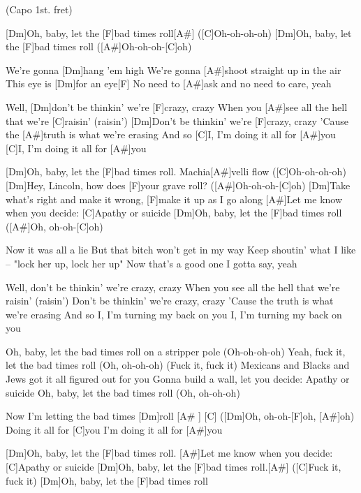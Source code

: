 
{\footnotesize(Capo 1st. fret)}

\begin{guitar}
	[Dm]Oh, baby, let the [F]bad times roll[A#] ([C]Oh-oh-oh-oh)
	[Dm]Oh, baby, let the [F]bad times roll ([A#]Oh-oh-oh-[C]oh)
	
	We're gonna [Dm]hang 'em high
	We’re gonna [A#]shoot straight up in the air
	This eye is [Dm]for an eye[F]{}
	No need to [A#]ask and no need to care, yeah
	
	Well, [Dm]don't be thinkin' we're [F]crazy, crazy
	When you [A#]see all the hell that we're [C]raisin' (raisin')
	[Dm]Don't be thinkin' we're [F]crazy, crazy
	'Cause the [A#]truth is what we're erasing
	And so [C]I, I’m doing it all for [A#]you
	[C]I, I'm doing it all for [A#]you
	
	[Dm]Oh, baby, let the [F]bad times roll. Machia[A#]velli flow ([C]Oh-oh-oh-oh)
	[Dm]Hey, Lincoln, how does [F]your grave roll? ([A#]Oh-oh-oh-[C]oh)
	[Dm]Take what’s right and make it wrong, [F]make it up as I go along
	[A#]Let me know when you decide: [C]Apathy or suicide
	[Dm]Oh, baby, let the [F]bad times roll ([A#]Oh, oh-oh-[C]oh)
	
	Now it was all a lie
	But that bitch won’t get in my way
	Keep shoutin’ what I like – "lock her up, lock her up"
	Now that’s a good one I gotta say, yeah
	
	\pagebreak
	
	Well, don't be thinkin' we're crazy, crazy
	When you see all the hell that we're raisin' (raisin')
	Don't be thinkin' we're crazy, crazy
	'Cause the truth is what we're erasing
	And so I, I’m turning my back on you
	I, I’m turning my back on you
	
	Oh, baby, let the bad times roll on a stripper pole (Oh-oh-oh-oh)
	Yeah, fuck it, let the bad times roll (Oh, oh-oh-oh) (Fuck it, fuck it)
	Mexicans and Blacks and Jews got it all figured out for you
	Gonna build a wall, let you decide: Apathy or suicide
	Oh, baby, let the bad times roll (Oh, oh-oh-oh)
	
	Now I'm letting the bad times [Dm]roll [A# ] [C]{}
	([Dm]Oh, oh-oh-[F]oh, [A#]oh)
	Doing it all for [C]you
	I'm doing it all for [A#]you
	
	 
	
	[Dm]Oh, baby, let the [F]bad times roll.
	[A#]Let me know when you decide: [C]Apathy or suicide
	[Dm]Oh, baby, let the [F]bad times roll.[A#] ([C]Fuck it, fuck it)
	[Dm]Oh, baby, let the [F]bad times roll
\end{guitar}